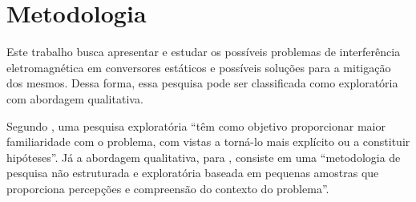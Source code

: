 \chapter{Metodologia}
    
    Este trabalho busca apresentar e estudar os possíveis problemas de interferência eletromagnética em conversores estáticos e possíveis soluções para a mitigação dos mesmos. Dessa forma, essa pesquisa pode ser classificada como exploratória com abordagem qualitativa. 
    
    Segundo , uma pesquisa exploratória ``têm como objetivo proporcionar maior familiaridade com o problema, com vistas a torná-lo mais explícito ou a constituir hipóteses''. Já a abordagem qualitativa, para , consiste em uma ``metodologia de pesquisa não estruturada e exploratória baseada em pequenas amostras que proporciona percepções e compreensão do contexto do problema''.
    